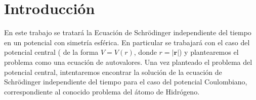 \section{Introducción}
En este trabajo se tratará la Ecuación de Schrödinger independiente del tiempo en un potencial con simetría esférica. En particular se trabajará con el caso del potencial central ( de la forma \(V = V(r)\), donde \(r = |\mathbf{r}|\)) y plantearemos el problema como una ecuación de autovalores. Una vez planteado el problema del potencial central, intentaremos encontrar la solución de la ecuación de Schrödinger independiente del tiempo para el caso del potencial Coulombiano, correspondiente al conocido problema del átomo de Hidrógeno.
